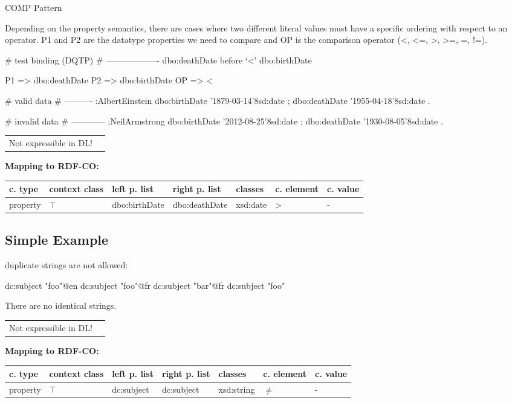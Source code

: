\documentclass{llncs}
\newenvironment{gcotable}{
  \scriptsize
  \sffamily
  \vspace{0cm}
	\begin{center}
	\textbf{\vspace{0.4cm}Mapping to RDF-CO:} \\
  \begin{tabular}{l|l|l|l|l|l|l}
	\hline
  \textbf{c. type} & \textbf{context class} & \textbf{left p. list} & \textbf{right p. list} & \textbf{classes} & \textbf{c. element} & \textbf{c. value} \\
  \hline

}{
  \hline
  \end{tabular}
	\end{center}
}
\newenvironment{DL}{
  \vspace{0cm}
	\begin{center}
  \begin{tabular}{r l}

}{
  \end{tabular}
	\end{center}
}
\begin{document}
COMP Pattern \cite{Kontokostas2014} 

Depending on the property semantics,
there are cases where two different literal values must have
a specific ordering with respect to an operator. 
P1 and P2 are the datatype properties we need to compare and 
OP is the comparison operator (\textless, \textless=, \textgreater, \textgreater=, =, !=). 

\begin{ex}
# test binding (DQTP)
# -------------------
dbo:deathDate before ‘<’ dbo:birthDate

P1 => dbo:deathDate
P2 => dbo:birthDate
OP => <
\end{ex}

\begin{ex}
# valid data
# ----------
:AlbertEinstein
    dbo:birthDate '1879-03-14'^^xsd:date ;
    dbo:deathDate '1955-04-18'^^xsd:date .
\end{ex}

\begin{ex}
# invalid data
# ------------
:NeilArmstrong
    dbo:birthDate '2012-08-25'^^xsd:date ;
    dbo:deathDate '1930-08-05'^^xsd:date .
\end{ex}

\begin{DL}
Not expressible in DL!
\end{DL}

\begin{gcotable}
property & $\top$ & dbo:birthDate & dbo:deathDate & xsd:date & \textgreater & - \\
\end{gcotable}

\subsection{Simple Example}

duplicate strings are not allowed:

\begin{ex}
dc:subject "foo"@en
dc:subject "foo"@fr
dc:subject "bar"@fr
dc:subject "foo"
\end{ex}

There are no identical strings.

\begin{DL}
Not expressible in DL!
\end{DL}

\begin{gcotable}
property & $\top$ & dc:subject & dc:subject & xsd:string & $\neq$ & - \\
\end{gcotable}
\end{document}
